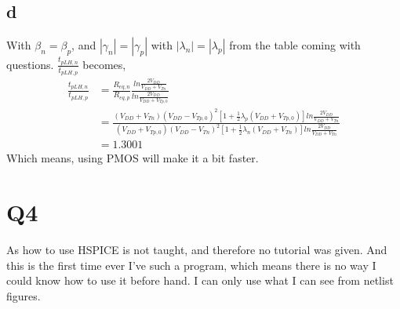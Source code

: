 \documentclass[a4paper,10pt]{article}
\begin{document}
\subsection*{d}
With \begin{math}\beta_n = \beta_p\end{math}, and \begin{math}|\gamma_n| = |\gamma_p|\end{math} with 
\begin{math}|\lambda_n| = |\lambda_p|\end{math} from the table coming with questions.
\begin{math}\frac{t_{pLH, n}}{t_{pLH, p}}\end{math} becomes,
\begin{equation}
 \begin{split}
  \frac{t_{pLH, n}}{t_{pLH, p}} &= \frac{R_{eq, n}}{R_{eq, p}}\frac{ln\frac{2V_{DD}}{V_{DD} + V_{Tn}}}{ln\frac{2V_{DD}}{V_{DD} + 
  V_{Tp, 0}}} \\
  &= \frac{(V_{DD}+V_{Tn})(V_{DD}-V_{Tp, 0})^2 [1+\frac{1}{2}\lambda_p(V_{DD}+V_{Tp, 0})]ln\frac{2V_{DD}}{V_{DD} + V_{Tn}}}
  {(V_{DD}+V_{Tp, 0})(V_{DD}-V_{Tn})^2 [1+\frac{1}{2}\lambda_n(V_{DD}+V_{Tn})]ln\frac{2V_{DD}}{V_{DD} + V_{Tn}}}\\
  &=1.3001
 \end{split}
\end{equation}
Which means, using PMOS will make it a bit faster.
\section*{Q4}
As how to use HSPICE is not taught, and therefore no tutorial was given. And this is the first time ever I've such a program, which
means there is no way I could know how to use it before hand. I can only use what I can see from netlist figures.
\end{document}
